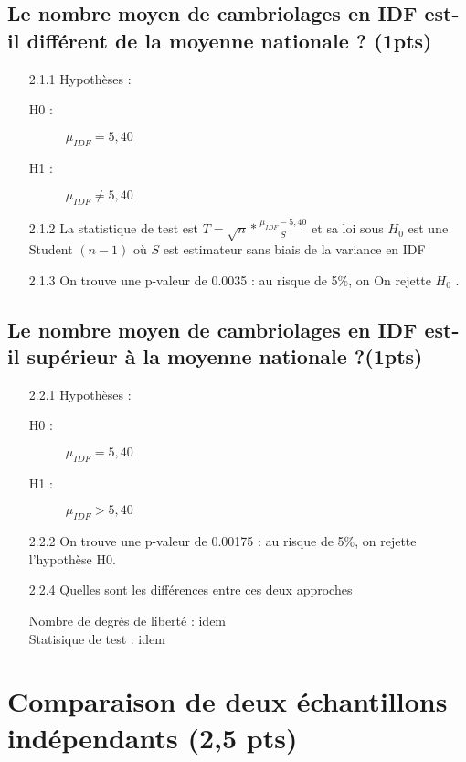 \documentclass{article}
\begin{document}
\subsection{Le nombre moyen de cambriolages en IDF est-il différent de la moyenne nationale ? (1pts)}
\begin{itemize}
	\item[2.1.1] Hypothèses : 
\begin{description}
    \item[H0 :]  $\mu_{IDF}=5,40$ 
    \item[H1 :]$\mu_{IDF} \neq 5,40$ 
\end{description}
 \item[2.1.2] La statistique de test est $T=\sqrt{n}* \frac{\mu_{IDF} - 5,40}{S}$  et sa loi sous $H_0$ est une  Student $(n-1)$
où $S$ est estimateur sans biais de la variance en IDF

\item[2.1.3] On trouve une p-valeur de 0.0035 : au risque de 5\%, on On rejette $H_0$ .
\end{itemize}

\subsection{Le nombre moyen de cambriolages en IDF est-il supérieur à la moyenne nationale ?(1pts)}
\begin{itemize}
	\item[2.2.1] Hypothèses : 
\begin{description}
    \item[H0 :] $\mu_{IDF}=5,40$
    \item[H1 :] $\mu_{IDF} > 5,40$ 
\end{description}
 
\item[2.2.2] On trouve une p-valeur de 0.00175 : au risque de 5\%, on rejette l'hypothèse H0.

\item[2.2.4]Quelles sont les différences entre ces deux approches 
\begin{description}
    \item[Nombre de degrés de liberté : idem]
    \item[Statisique de test : idem]
\end{description}
\end{itemize}



\section{Comparaison de deux échantillons indépendants (2,5 pts)}
\end{document}
